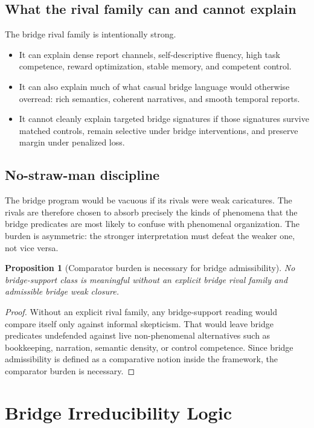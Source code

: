 \documentclass[11pt,a4paper]{article}
\newtheorem{proposition}[theorem]{Proposition}
\theoremstyle{definition}
\begin{document}
\subsection{What the rival family can and cannot explain}
The bridge rival family is intentionally strong.
\begin{itemize}[leftmargin=1.5em]
\item It can explain dense report channels, self-descriptive fluency, high task competence, reward optimization, stable memory, and competent control.
\item It can also explain much of what casual bridge language would otherwise overread: rich semantics, coherent narratives, and smooth temporal reports.
\item It cannot cleanly explain targeted bridge signatures if those signatures survive matched controls, remain selective under bridge interventions, and preserve margin under penalized loss.
\end{itemize}

\subsection{No-straw-man discipline}
The bridge program would be vacuous if its rivals were weak caricatures. The rivals are therefore chosen to absorb precisely the kinds of phenomena that the bridge predicates are most likely to confuse with phenomenal organization. The burden is asymmetric: the stronger interpretation must defeat the weaker one, not vice versa.

\begin{proposition}[Comparator burden is necessary for bridge admissibility]
No bridge-support class is meaningful without an explicit bridge rival family and admissible bridge weak closure.
\end{proposition}

\begin{proof}
Without an explicit rival family, any bridge-support reading would compare itself only against informal skepticism. That would leave bridge predicates undefended against live non-phenomenal alternatives such as bookkeeping, narration, semantic density, or control competence. Since bridge admissibility is defined as a comparative notion inside the framework, the comparator burden is necessary.
\end{proof}

\section{Bridge Irreducibility Logic}
\end{document}
